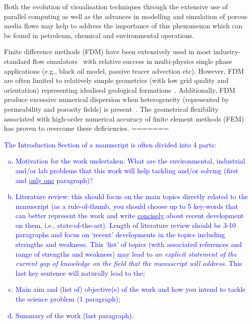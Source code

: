 \documentclass[preprint,authoryear,12pt]{elsarticle}
\newcommand{\blue}{\textcolor{blue}}
\begin{document}
Both the evolution of visualisation techniques through the extensive use of parallel computing as well as the advances in modelling and simulation of porous media flows may help to address the importance of this phenomenon which can be found in petroleum, chemical and environmental operations. 

Finite difference methods (FDM) have been extensively used in most industry-standard flow simulators~\citep{aziz_1986, chen_2005, chang_1990} with relative success in multi-physics single phase applications (e.g., black oil model, passive tracer advection etc). However, FDM are often limited to relatively simple geometries (with low grid quality and orientation) representing idealised geological formations~\citep{mlacnik_2004, king_1999}. Additionally, FDM produce excessive numerical dispersion when heterogeneity (represented by permeability and porosity fields) is present~\citep{chavent_1986}. The geometrical flexibility associated with high-order numerical accuracy of finite element methods (FEM) has proven to overcome these deficiencies. 
=======
\blue{The Introduction Section of a manuscript is often divided into 4 parts:
   \begin{enumerate}[(a)]
       \item Motivation for the work undertaken. What are the environmental, industrial and/or lab problems that this work will help tackling and/or solving (first and \underline{only one} paragraph)? 
       \item Literature review: this should focus on the main topics directly related to the manuscript (as a rule-of-thumb, you should choose up to 5 key-words that can better represent the work and write \underline{concisely} about recent development on them, i.e., state-of-the-art). Length of literature review should be 3-10 paragraphs and focus on `recent' developments in the topics including strengths and weakness. This `list' of topics (with associated references and range of strengths and weakness) may lead to {\it an explicit statement of the current gap of knowledge on the field that the manuscript will address}. This last key sentence will naturally lead to the;
       \item Main aim and (list of) objective(s) of the work and how you intend to tackle the science problem (1 paragraph);
       \item Summary of the work (last paragraph). 
   \end{enumerate}
}
\end{document}
